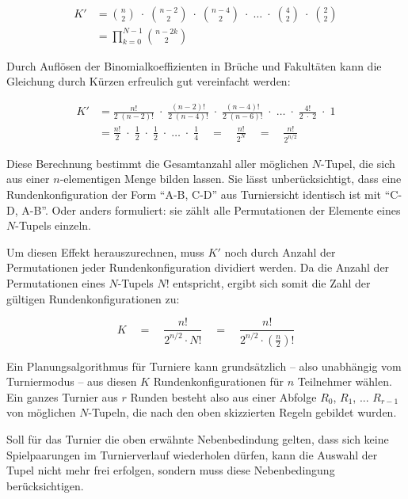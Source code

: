 \documentclass[DIV=15, 10pt]{scrartcl}
\begin{document}
\begin{align}
K' &= {{n}\choose{2}} \; \cdot \; {{n-2}\choose{2}} \; \cdot \;{{n-4}\choose{2}} \; \cdot \; \ldots
\; \cdot \; {{4}\choose{2}} \; \cdot \; {{2}\choose{2}}\nonumber \\[3mm]
&= \prod_{k = 0}^{N - 1}{{n - 2k}\choose{2}}
\end{align}

Durch Auflösen der Binomialkoeffizienten in Brüche und Fakultäten kann die Gleichung durch Kürzen erfreulich gut vereinfacht werden:

\begin{align}\label{eqNumTuplesWithPermutation}
K' &= \frac{n!}{2 \; (n-2)!} \; \cdot \; \frac{(n - 2)!}{2 \; (n-4)!} \; \cdot \; \frac{(n - 4)!}
{2 \; (n-6)!} \; \cdot \; \ldots \; \cdot \; \frac{4!}{2 \; \cdot \; 2} \; \cdot \; 1 \nonumber \\[3mm]
&= \frac{n!}{2} \; \cdot \; \frac{1}{2} \; \cdot \; \frac{1}{2} \; \cdot \; \ldots \; \cdot \; \frac{1}{4} 
\quad = \quad \frac{n!}{2^N} \quad = \quad \frac{n!}{2^{n/2}}
\end{align}

Diese Berechnung bestimmt die Gesamtanzahl aller möglichen $N$-Tupel, die sich aus einer $n$-elementigen Menge bilden lassen. Sie lässt unberücksichtigt, dass eine Rundenkonfiguration der Form "`A-B, C-D"' aus Turniersicht identisch ist mit "`C-D, A-B"'. Oder anders formuliert: sie zählt alle Permutationen der Elemente eines $N$-Tupels einzeln.

Um diesen Effekt herauszurechnen, muss $K'$ noch durch Anzahl der Permutationen jeder Rundenkonfiguration dividiert werden. Da die Anzahl der Permutationen eines $N$-Tupels $N!$ entspricht, ergibt sich somit die Zahl der gültigen Rundenkonfigurationen zu:

\begin{equation}
K \quad = \quad \frac{n!}{2^{n/2} \cdot N!} \quad = \quad \frac{n!}{2^{n/2} \cdot
\left(\frac{n}{2}\right)!}
\end{equation}

Ein Planungsalgorithmus für Turniere kann grundsätzlich -- also unabhängig vom Turniermodus -- aus diesen $K$ Rundenkonfigurationen für $n$ Teilnehmer wählen. Ein ganzes Turnier aus $r$ Runden besteht also aus einer Abfolge $R_0$, $R_1$, ... $R_{r-1}$ von möglichen $N$-Tupeln, die nach den oben skizzierten Regeln gebildet wurden.

Soll für das Turnier die oben erwähnte Nebenbedindung gelten, dass sich keine Spielpaarungen im Turnierverlauf wiederholen dürfen, kann die Auswahl der Tupel nicht mehr frei erfolgen, sondern muss diese Nebenbedingung berücksichtigen.
\end{document}
